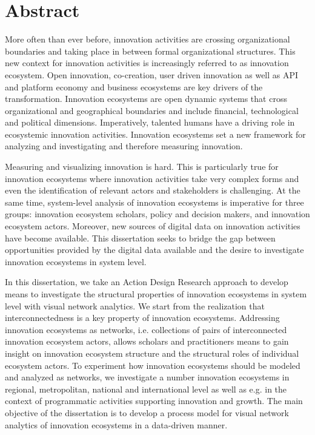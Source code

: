 \chapter{Abstract}
\label{chapter:abstract}


More often than ever before, innovation activities are crossing organizational boundaries and taking place in between formal organizational structures. This new context for innovation activities is increasingly referred to as innovation ecosystem. Open innovation, co-creation, user driven innovation as well as API and platform economy and business ecosystems are key drivers of the transformation. Innovation ecosystems are open dynamic systems that cross organizational and geographical boundaries and include financial, technological and political dimensions. Imperatively, talented humans have a driving role in ecosystemic innovation activities. Innovation ecosystems set a new framework for analyzing and investigating and therefore measuring innovation.

Measuring and visualizing innovation is hard. This is particularly true for innovation ecosystems where innovation activities take very complex forms and even the identification of relevant actors and stakeholders is challenging. At the same time, system-level analysis of innovation ecosystems is imperative for three groups: innovation ecosystem scholars, policy and decision makers, and innovation ecosystem actors. Moreover, new sources of digital data on innovation activities have become available. This dissertation seeks to bridge the gap between opportunities provided by the digital data available and the desire to investigate innovation ecosystems in system level.

In this dissertation, we take an Action Design Research approach to develop means to investigate the structural properties of innovation ecosystems in system level with visual network analytics. We start from the realization that interconnectedness is a key property of innovation ecosystems. Addressing innovation ecosystems as networks, i.e. collections of pairs of interconnected innovation ecosystem actors, allows scholars and practitioners means to gain insight on innovation ecosystem structure and the structural roles of individual ecosystem actors. To experiment how innovation ecosystems should be modeled and analyzed as networks, we investigate a number innovation ecosystems in regional, metropolitan, national and international level as well as e.g. in the context of programmatic activities supporting innovation and growth. The main objective of the dissertation is to develop a process model for visual network analytics of innovation ecosystems in a data-driven manner. 

